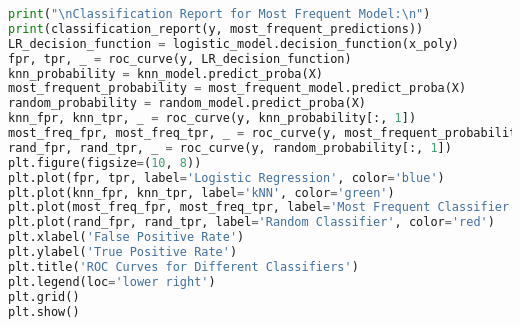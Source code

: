 \documentclass[a4paper,10pt]{article}
\begin{document}
\begin{lstlisting}[language=Python, caption={}]
print("\nClassification Report for Most Frequent Model:\n")
print(classification_report(y, most_frequent_predictions))
LR_decision_function = logistic_model.decision_function(x_poly)
fpr, tpr, _ = roc_curve(y, LR_decision_function)
knn_probability = knn_model.predict_proba(X)
most_frequent_probability = most_frequent_model.predict_proba(X)
random_probability = random_model.predict_proba(X)
knn_fpr, knn_tpr, _ = roc_curve(y, knn_probability[:, 1])
most_freq_fpr, most_freq_tpr, _ = roc_curve(y, most_frequent_probability[:, 1])
rand_fpr, rand_tpr, _ = roc_curve(y, random_probability[:, 1])
plt.figure(figsize=(10, 8))
plt.plot(fpr, tpr, label='Logistic Regression', color='blue')
plt.plot(knn_fpr, knn_tpr, label='kNN', color='green')
plt.plot(most_freq_fpr, most_freq_tpr, label='Most Frequent Classifier', color='orange')
plt.plot(rand_fpr, rand_tpr, label='Random Classifier', color='red')
plt.xlabel('False Positive Rate')
plt.ylabel('True Positive Rate')
plt.title('ROC Curves for Different Classifiers')
plt.legend(loc='lower right')
plt.grid()
plt.show()

\end{lstlisting}
\end{document}
